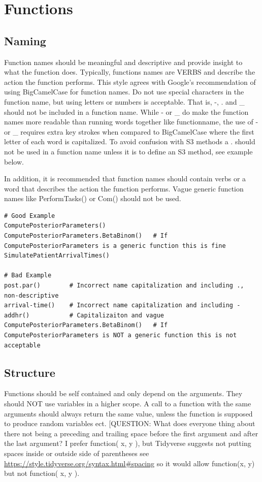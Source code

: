 \documentclass[
]{book}
\begin{document}
\hypertarget{functions}{%
\chapter{Functions}\label{functions}}

\hypertarget{naming}{%
\section{Naming}\label{naming}}

Function names should be meaningful and descriptive and provide insight to what the function does. Typically, functions names are VERBS and describe the action the function performs. This style agrees with Google's recommendation of using BigCamelCase for function names. Do not use special characters in the function name, but using letters or numbers is acceptable. That is, -, . and \_ should not be included in a function name. While - or \_ do make the function names more readable than running words together like functionname, the use of - or \_ requires extra key strokes when compared to BigCamelCase where the first letter of each word is capitalized. To avoid confusion with S3 methods a . should not be used in a function name unless it is to define an S3 method, see example below.

In addition, it is recommended that function names should contain verbs or a word that describes the action the function performs. Vague generic function names like PerformTasks() or Com() should not be used.

\begin{verbatim}
# Good Example 
ComputePosteriorParameters()
ComputePosteriorParameters.BetaBinom()   # If ComputePosteriorParameters is a generic function this is fine
SimulatePatientArrivalTimes()

# Bad Example
post.par()        # Incorrect name capitalization and including ., non-descriptive
arrival-time()    # Incorrect name capitalization and including -
addhr()           # Capitalizaiton and vague
ComputePosteriorParameters.BetaBinom()   # If ComputePosteriorParameters is NOT a generic function this is not acceptable
\end{verbatim}

\hypertarget{structure}{%
\section{Structure}\label{structure}}

Functions should be self contained and only depend on the arguments. They should NOT use variables in a higher scope. A call
to a function with the same arguments should always return the same value, unless the function is supposed to produce random variables ect.
{[}QUESTION: What does everyone thing about there not being a preceding and trailing space before the first argument and after the last argument? I prefer function( x, y ), but Tidyverse suggests not putting spaces inside or outside side of parentheses see \url{https://style.tidyverse.org/syntax.html\#spacing} so it would allow function(x, y) but not function( x, y ).
\end{document}
